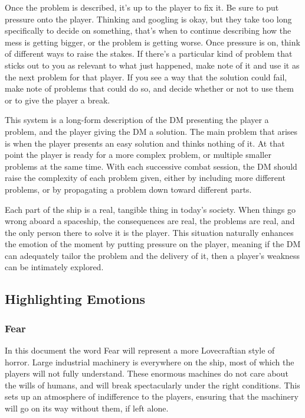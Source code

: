 \documentclass[a4paper]{article}
\begin{document}
Once the problem is described, it's up to the player to fix it. Be sure to put pressure onto the player. Thinking and googling is okay, but they take too long specifically to decide on something, that's when to continue describing how the mess is getting bigger, or the problem is getting worse. Once pressure is on, think of different ways to raise the stakes. If there's a particular kind of problem that sticks out to you as relevant to what just happened, make note of it and use it as the next problem for that player. If you see a way that the solution could fail, make note of problems that could do so, and decide whether or not to use them or to give the player a break.

This system is a long-form description of the DM presenting the player a problem, and the player giving the DM a solution. The main problem that arises is when the player presents an easy solution and thinks nothing of it. At that point the player is ready for a more complex problem, or multiple smaller problems at the same time. With each successive combat session, the DM should raise the complexity of each problem given, either by including more different problems, or by propagating a problem down toward different parts.

Each part of the ship is a real, tangible thing in today's society. When things go wrong aboard a spaceship, the consequences are real, the problems are real, and the only person there to solve it is the player. This situation naturally enhances the emotion of the moment by putting pressure on the player, meaning if the DM can adequately tailor the problem and the delivery of it, then a player's weakness can be intimately explored.

\subsection{Highlighting Emotions}

\subsubsection{Fear} \label{fear}

In this document the word Fear will represent a more Lovecraftian style of horror. Large industrial machinery is everywhere on the ship, most of which the players will not fully understand. These enormous machines do not care about the wills of humans, and will break spectacularly under the right conditions. This sets up an atmosphere of indifference to the players, ensuring that the machinery will go on its way without them, if left alone. 
\end{document}
